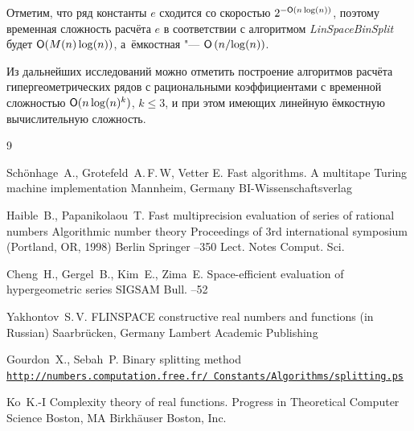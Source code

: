 Отметим, что ряд константы $e$ сходится со скоростью
$2^{-{\sf O}(n\log(n))}$, поэтому временная сложность расчёта $e$ в соответствии
с алгоритмом {\itshape LinSpaceBinSplit} будет ${\sf O}(M(n)\log(n))$,
а~ёмкостная "--- ${\sf O}\left({n}/{\log(n)}\right)$.

Из дальнейших исследований можно отметить построение алгоритмов
расчёта гипергеометрических рядов с рациональными коэффициентами
с временной сложностью ${\sf O}(n\log(n)^k)$, $k\le 3$,
и при этом имеющих линейную ёмкостную вычислительную сложность.


\vspace{-3mm}

\begin{thebibliography}{9}

\by Sch\"onhage~A., Grotefeld~A.\,F.\,W, Vetter E.
\book Fast algorithms. A multitape Turing machine implementation
\publaddr Mannheim, Germany
\publ BI-Wissenschaftsverlag

\by Haible~B., Papanikolaou~T.
\paper  Fast multiprecision evaluation of series of rational numbers 
\inbook  Algorithmic number theory
\bookinfo Proceedings of  3rd international symposium (Portland, OR, 1998)  
\publaddr Berlin
\publ Springer
--350
\serial Lect. Notes Comput. Sci.

\by Cheng~H., Gergel~B., Kim~E., Zima~E.
\paper Space-efficient evaluation of hypergeometric series
\jour SIGSAM Bull.
--52

\by Yakhontov~S.\,V.
\book FLINSPACE constructive real numbers and functions (in Russian)
\publaddr Saarbr\"ucken, Germany
\publ Lambert Academic Publishing


\by Gourdon~X., Sebah~P.
\eprint Binary splitting method 
\eprintinfo \href{http://numbers.computation.free.fr/Constants/Algorithms/splitting.ps}{\tt http://numbers.computation.free.fr/ Constants/Algorithms/splitting.ps}


\by Ko~K.-I
\book Complexity theory of real functions. Progress in Theoretical Computer Science
\publaddr Boston, MA
\publ Birkh\"auser Boston, Inc.


\end{thebibliography}

\noindent
\hskip6.5cm \thedate \par\noindent
\hskip6.5cm\therevdate

\vspace{-6mm}

\makeengtitle

\newpage

%

